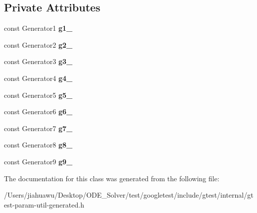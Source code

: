 \subsection*{Private Attributes}
\begin{DoxyCompactItemize}
\item 
\mbox{\label{classtesting_1_1internal_1_1_cartesian_product_holder9_a729b06a268bac92a0e8264cf25d9d1a3}} 
const Generator1 {\bfseries g1\+\_\+}
\item 
\mbox{\label{classtesting_1_1internal_1_1_cartesian_product_holder9_aec512e6ebccab973f6e281a6e8d95266}} 
const Generator2 {\bfseries g2\+\_\+}
\item 
\mbox{\label{classtesting_1_1internal_1_1_cartesian_product_holder9_a859752b169cb09897b238c5b8c35b7f7}} 
const Generator3 {\bfseries g3\+\_\+}
\item 
\mbox{\label{classtesting_1_1internal_1_1_cartesian_product_holder9_ad1e82536ec23059909cea641aba318b0}} 
const Generator4 {\bfseries g4\+\_\+}
\item 
\mbox{\label{classtesting_1_1internal_1_1_cartesian_product_holder9_af2c054f3b1ded0b749ab2b1c88cb373e}} 
const Generator5 {\bfseries g5\+\_\+}
\item 
\mbox{\label{classtesting_1_1internal_1_1_cartesian_product_holder9_a76e3b9d7f1e38dcf5649fe0e765d23e3}} 
const Generator6 {\bfseries g6\+\_\+}
\item 
\mbox{\label{classtesting_1_1internal_1_1_cartesian_product_holder9_a9d4911b6d62092fa04e9601d6b604add}} 
const Generator7 {\bfseries g7\+\_\+}
\item 
\mbox{\label{classtesting_1_1internal_1_1_cartesian_product_holder9_ac6d5f1d80d12f38c2d08b88b98959160}} 
const Generator8 {\bfseries g8\+\_\+}
\item 
\mbox{\label{classtesting_1_1internal_1_1_cartesian_product_holder9_aad717597315c41d2933affec767e2c70}} 
const Generator9 {\bfseries g9\+\_\+}
\end{DoxyCompactItemize}


The documentation for this class was generated from the following file\+:\begin{DoxyCompactItemize}
\item 
/\+Users/jiahuawu/\+Desktop/\+O\+D\+E\+\_\+\+Solver/test/googletest/include/gtest/internal/gtest-\/param-\/util-\/generated.\+h\end{DoxyCompactItemize}

